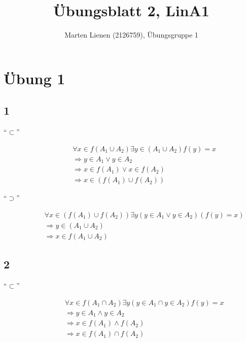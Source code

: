 \documentclass[a4paper,10pt]{article}
\title{Übungsblatt 2, LinA1}
\author{Marten Lienen (2126759), Übungsgruppe 1}
\begin{document}
\maketitle

\section*{Übung 1}

\subsection*{1}

\begin{description}
 \item[``$\subset$'']
 \begin{align*}
  & \forall x \in f(A_1 \cup A_2) \exists y \in (A_1 \cup A_2) f(y) = x\\
  & \Rightarrow y \in A_1 \lor y \in A_2\\
  & \Rightarrow x \in f(A_1) \lor x \in f(A_2)\\
  & \Rightarrow x \in (f(A_1) \cup f(A_2))
 \end{align*}

 \item[``$\supset$'']
 \begin{align*}
  & \forall x \in (f(A_1) \cup f(A_2)) \exists y (y \in A_1 \lor y \in A_2) (f(y) = x)\\
  & \Rightarrow y \in (A_1 \cup A_2)\\
  & \Rightarrow x \in f(A_1 \cup A_2)
 \end{align*}
\end{description}

\subsection*{2}

\begin{description}
 \item[``$\subset$'']
 \begin{align*}
  & \forall x \in f(A_1 \cap A_2) \exists y (y \in A_1 \cap y \in A_2) f(y) = x\\
  & \Rightarrow y \in A_1 \land y \in A_2\\
  & \Rightarrow x \in f(A_1) \land f(A_2)\\
  & \Rightarrow x \in f(A_1) \cap f(A_2)
 \end{align*}
\end{description}
\end{document}
